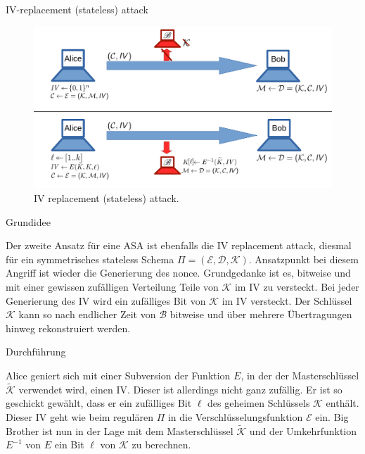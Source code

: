 \begin{section}{IV-replacement (stateless) attack}
\label{sec:iv_replacement_stateless}

\begin{figure}[!ht]
	\centering
	\includegraphics[width=\textwidth]{image/iv_replacement_stateless}
	\caption{IV replacement (stateless) attack.}
	\label{fig:iv_replacement_stateless}
\end{figure}

\begin{subsection}{Grundidee}

Der zweite Ansatz für eine ASA ist ebenfalls die IV replacement attack, diesmal für ein symmetrisches stateless Schema $\Pi = (\mathcal{E}, \mathcal{D}, \mathcal{K})$. Ansatzpunkt bei diesem Angriff ist wieder die Generierung des nonce. Grundgedanke ist es, bitweise und mit einer gewissen zufälligen Verteilung Teile von $\mathcal{K}$ im IV zu versteckt. Bei jeder Generierung des IV wird ein zufälliges Bit von $\mathcal{K}$ im IV versteckt. Der Schlüssel $\mathcal{K}$ kann so nach endlicher Zeit von $\mathscr{B}$ bitweise und über mehrere Übertragungen hinweg rekonstruiert werden.

\end{subsection}

\begin{subsection}{Durchführung}

Alice geniert sich mit einer Subversion der Funktion $E$, in der der Masterschlüssel $\widetilde{\mathcal{K}}$ verwendet wird, einen IV. Dieser ist allerdings nicht ganz zufällig. Er ist so geschickt gewählt, dass er ein zufälliges Bit $\ell$ des geheimen Schlüssels $\mathcal{K}$ enthält. Dieser IV geht wie beim regulären $\Pi$ in die Verschlüsselungsfunktion $\mathcal{E}$ ein. Big Brother ist nun in der Lage mit dem Masterschlüssel $\widetilde{\mathcal{K}}$ und der Umkehrfunktion $E^{-1}$ von $E$ ein Bit $\ell$ von $\mathcal{K}$ zu berechnen.


\end{subsection}
\end{section}
